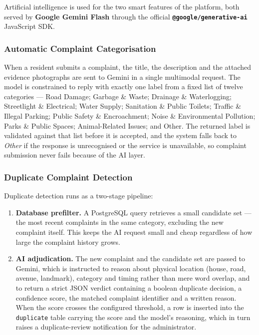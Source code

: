 \documentclass[11pt,a4paper]{article}
\newcommand{\code}[1]{\texttt{\small #1}}
\begin{document}
Artificial intelligence is used for the two smart features of the platform, both
served by \textbf{Google Gemini Flash} through the official
\textbf{\code{@google/generative-ai}} JavaScript SDK.

\subsubsection{Automatic Complaint Categorisation}

When a resident submits a complaint, the title, the description and the attached
evidence photographs are sent to Gemini in a single multimodal request. The model
is constrained to reply with exactly one label from a fixed list of twelve
categories --- Road Damage; Garbage \& Waste; Drainage \& Waterlogging;
Streetlight \& Electrical; Water Supply; Sanitation \& Public Toilets; Traffic \&
Illegal Parking; Public Safety \& Encroachment; Noise \& Environmental Pollution;
Parks \& Public Spaces; Animal-Related Issues; and Other. The returned label is
validated against that list before it is accepted, and the system falls back to
\emph{Other} if the response is unrecognised or the service is unavailable, so
complaint submission never fails because of the AI layer.

\subsubsection{Duplicate Complaint Detection}

Duplicate detection runs as a two-stage pipeline:

\begin{enumerate}[leftmargin=1.6em,itemsep=0.35em]
  \item \textbf{Database prefilter.} A PostgreSQL query retrieves a small
        candidate set --- the most recent complaints in the same category,
        excluding the new complaint itself. This keeps the AI request small and
        cheap regardless of how large the complaint history grows.
  \item \textbf{AI adjudication.} The new complaint and the candidate set are
        passed to Gemini, which is instructed to reason about physical location
        (house, road, avenue, landmark), category and timing rather than mere word
        overlap, and to return a strict JSON verdict containing a boolean
        duplicate decision, a confidence score, the matched complaint identifier
        and a written reason. When the score crosses the configured threshold, a
        row is inserted into the \code{duplicate} table carrying the score and the
        model's reasoning, which in turn raises a duplicate-review notification
        for the administrator.
\end{enumerate}
\end{document}
